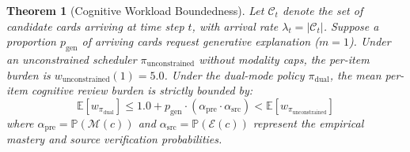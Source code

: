 \documentclass[11pt,a4paper]{article}
\newtheorem{theorem}{Theorem}
\begin{document}
\begin{theorem}[Cognitive Workload Boundedness]
\label{thm:workload}
Let $\mathcal{C}_t$ denote the set of candidate cards arriving at time step $t$, with arrival rate $\lambda_t = |\mathcal{C}_t|$. Suppose a proportion $p_{\text{gen}}$ of arriving cards request generative explanation ($m=1$). Under an unconstrained scheduler $\pi_{\text{unconstrained}}$ without modality caps, the per-item burden is $w_{\text{unconstrained}}(1) = 5.0$. Under the dual-mode policy $\pi_{\text{dual}}$, the mean per-item cognitive review burden is strictly bounded by:
\begin{equation}
    \mathbb{E}[w_{\pi_{\text{dual}}}] \le 1.0 + p_{\text{gen}} \cdot (\alpha_{\text{pre}} \cdot \alpha_{\text{src}}) < \mathbb{E}[w_{\pi_{\text{unconstrained}}}]
\end{equation}
where $\alpha_{\text{pre}} = \mathbb{P}(\mathcal{M}(c))$ and $\alpha_{\text{src}} = \mathbb{P}(\mathcal{E}(c))$ represent the empirical mastery and source verification probabilities.
\end{theorem}
\end{document}
